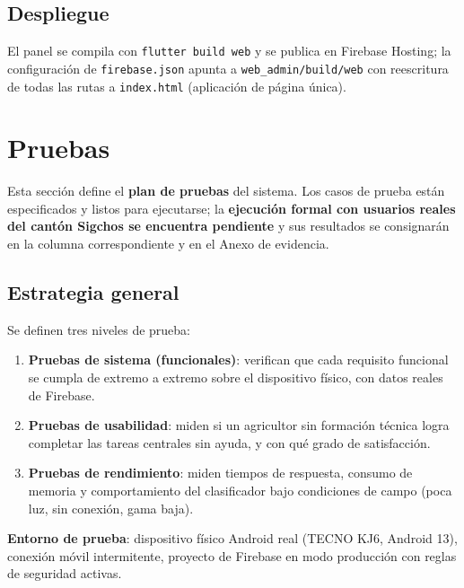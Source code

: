 \documentclass[12pt,a4paper]{article}
\begin{document}
\subsection{Despliegue}

El panel se compila con \texttt{flutter build web} y se publica en Firebase
Hosting; la configuración de \texttt{firebase.json} apunta a
\texttt{web\_admin/build/web} con reescritura de todas las rutas a
\texttt{index.html} (aplicación de página única).

\section{Pruebas}

Esta sección define el \textbf{plan de pruebas} del sistema. Los casos de prueba
están especificados y listos para ejecutarse; la \textbf{ejecución formal con
usuarios reales del cantón Sigchos se encuentra pendiente} y sus resultados se
consignarán en la columna correspondiente y en el Anexo de evidencia.

\subsection{Estrategia general}

Se definen tres niveles de prueba:

\begin{enumerate}
  \item \textbf{Pruebas de sistema (funcionales)}: verifican que cada
        requisito funcional se cumpla de extremo a extremo sobre el dispositivo
        físico, con datos reales de Firebase.
  \item \textbf{Pruebas de usabilidad}: miden si un agricultor sin formación
        técnica logra completar las tareas centrales sin ayuda, y con qué grado
        de satisfacción.
  \item \textbf{Pruebas de rendimiento}: miden tiempos de respuesta, consumo de
        memoria y comportamiento del clasificador bajo condiciones de campo
        (poca luz, sin conexión, gama baja).
\end{enumerate}

\textbf{Entorno de prueba}: dispositivo físico Android real (TECNO KJ6,
Android 13), conexión móvil intermitente, proyecto de Firebase en modo
producción con reglas de seguridad activas.
\end{document}
